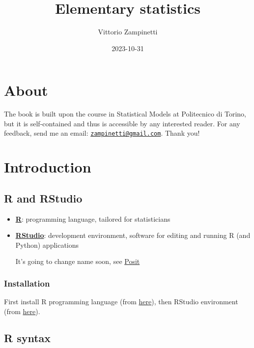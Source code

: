 \documentclass[
  oneside]{book}
\title{Elementary statistics}
\author{Vittorio Zampinetti}
\date{2023-10-31}
\begin{document}
\maketitle

{
\setcounter{tocdepth}{2}
\tableofcontents
}
\hypertarget{about}{%
\chapter*{About}\label{about}}

The book is built upon the course in Statistical Models at
Politecnico di Torino, but it is self-contained and thus is
accessible by any interested reader. For any feedback, send me
an email: \href{mailto:zampinetti@gmail.com}{\nolinkurl{zampinetti@gmail.com}}. Thank you!

\hypertarget{introduction}{%
\chapter{Introduction}\label{introduction}}

\hypertarget{r-and-rstudio}{%
\section{R and RStudio}\label{r-and-rstudio}}

\begin{itemize}
\item
  \href{https://www.r-project.org/}{\textbf{R}}: programming language, tailored for
  statisticians
\item
  \href{https://www.rstudio.com/}{\textbf{RStudio}}: development environment, software for
  editing and running R (and Python) applications

  It's going to change name soon, see \href{https://posit.co/}{Posit}
\end{itemize}

\hypertarget{installation}{%
\subsection{Installation}\label{installation}}

First install R programming language (from \href{https://cran.rstudio.com/}{here}),
then RStudio environment (from
\href{https://www.rstudio.com/products/rstudio/download/\#download}{here}).

\hypertarget{r-syntax}{%
\section{R syntax}\label{r-syntax}}
\end{document}
